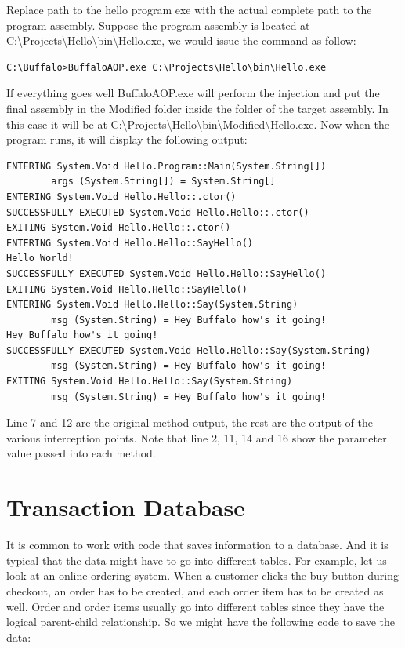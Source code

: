 Replace path to the hello program exe with the actual complete path to the program assembly. Suppose the program assembly is located at C:\textbackslash{Projects}\textbackslash{Hello}\textbackslash{bin}\textbackslash{Hello.exe}, we would issue the command as follow:

\begin{lstlisting}[caption={Invoking BuffaloAOP.exe Example}, label=buffalocmd2, frame=tb, basicstyle=\scriptsize]
C:\Buffalo>BuffaloAOP.exe C:\Projects\Hello\bin\Hello.exe
\end{lstlisting}

If everything goes well BuffaloAOP.exe will perform the injection and put the final assembly in the Modified folder inside the folder of the target assembly. In this case it will be at C:\textbackslash{Projects}\textbackslash{Hello}\textbackslash{bin}\textbackslash{Modified}\textbackslash{Hello.exe}. Now when the program runs, it will display the following output:

\begin{lstlisting}[caption={TraceAspect output}, label=traceaspectout, frame=tb, basicstyle=\scriptsize]
ENTERING System.Void Hello.Program::Main(System.String[])
        args (System.String[]) = System.String[]
ENTERING System.Void Hello.Hello::.ctor()
SUCCESSFULLY EXECUTED System.Void Hello.Hello::.ctor()
EXITING System.Void Hello.Hello::.ctor()
ENTERING System.Void Hello.Hello::SayHello()
Hello World!
SUCCESSFULLY EXECUTED System.Void Hello.Hello::SayHello()
EXITING System.Void Hello.Hello::SayHello()
ENTERING System.Void Hello.Hello::Say(System.String)
        msg (System.String) = Hey Buffalo how's it going!
Hey Buffalo how's it going!
SUCCESSFULLY EXECUTED System.Void Hello.Hello::Say(System.String)
        msg (System.String) = Hey Buffalo how's it going!
EXITING System.Void Hello.Hello::Say(System.String)
        msg (System.String) = Hey Buffalo how's it going!
\end{lstlisting}

Line 7 and 12 are the original method output, the rest are the output of the various interception points. Note that line 2, 11, 14 and 16 show the parameter value passed into each method.

\section{Transaction Database}

It is common to work with code that saves information to a database. And it is typical that the data might have to go into different tables. For example, let us look at an online ordering system. When a customer clicks the buy button during checkout, an order has to be created, and each order item has to be created as well. Order and order items usually go into different tables since they have the logical parent-child relationship. So we might have the following code to save the data:

